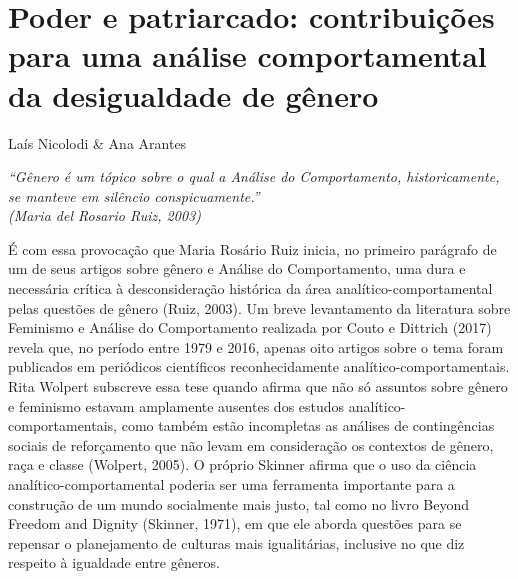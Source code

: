 \setcounter{footnote}{0}
\setcounter{figure}{0}
\setcounter{table}{0}
\chapter*{Poder e patriarcado: contribuições para uma análise comportamental da desigualdade de gênero}
\begin{flushright}
\begin{small}
Laís Nicolodi \& Ana Arantes
\end{small}
\vspace{1cm}

\emph{``Gênero é um tópico sobre o qual a Análise do Comportamento, historicamente, se manteve em silêncio conspicuamente.''\\ (Maria del Rosario Ruiz, 2003)}
\end{flushright}

É com essa provocação que Maria Rosário Ruiz inicia, no primeiro parágrafo de um de seus artigos sobre gênero e Análise do Comportamento, uma dura e necessária crítica à desconsideração histórica da área analítico-comportamental pelas questões de gênero (Ruiz, 2003). Um breve levantamento da literatura sobre Feminismo e Análise do Comportamento realizada por Couto e Dittrich (2017) revela que, no período entre 1979 e 2016, apenas oito artigos sobre o tema foram publicados em periódicos científicos reconhecidamente analítico-compor\-tamentais. Rita Wolpert subscreve essa tese quando afirma que não só assuntos sobre gênero e feminismo estavam amplamente ausentes dos estudos analítico-comportamentais, como também estão incompletas as análises de contingências sociais de reforçamento que não levam em consideração os contextos de gênero, raça e classe (Wolpert, 2005). O próprio Skinner afirma que o uso da ciência analítico-comportamental poderia ser uma ferramenta importante para a construção de um mundo socialmente mais justo, tal como no livro Beyond Freedom and Dignity (Skinner, 1971), em que ele aborda questões para se repensar o planejamento de culturas mais igualitárias, inclusive no que diz respeito à igualdade entre gêneros.


